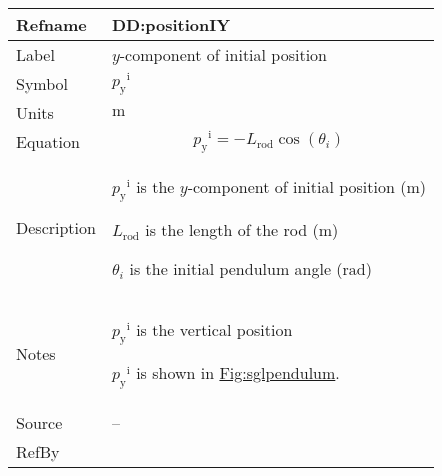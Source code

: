\documentclass[12pt]{article}
\begin{document}
\vspace{\baselineskip}
\noindent
\begin{minipage}{\textwidth}
\begin{tabular}{>{\raggedright}p{}>{\raggedright\arraybackslash}p{}}
\toprule \textbf{Refname} & \textbf{DD:positionIY}
\label{DD:positionIY}
\\ \midrule
Label & $y$-component of initial position
        
\\ \midrule
Symbol & ${{p_{\text{y}}}^{\text{i}}}$
         
\\ \midrule
Units & ${\text{m}}$
        
\\ \midrule
Equation & \begin{displaymath}
           {{p_{\text{y}}}^{\text{i}}}=-{L_{\text{rod}}} \cos\left({θ_{i}}\right)
           \end{displaymath}
\\ \midrule
Description & \begin{symbDescription}
              \item{${{p_{\text{y}}}^{\text{i}}}$ is the $y$-component of initial position (${\text{m}}$)}
              \item{${L_{\text{rod}}}$ is the length of the rod (${\text{m}}$)}
              \item{${θ_{i}}$ is the initial pendulum angle (${\text{rad}}$)}
              \end{symbDescription}
\\ \midrule
Notes & ${{p_{\text{y}}}^{\text{i}}}$ is the vertical position
        
        ${{p_{\text{y}}}^{\text{i}}}$ is shown in \hyperref[Figure:sglpendulum]{Fig:sglpendulum}.
        
\\ \midrule
Source & --
         
\\ \midrule
RefBy & 
\\ \bottomrule
\end{tabular}
\end{minipage}
\end{document}

